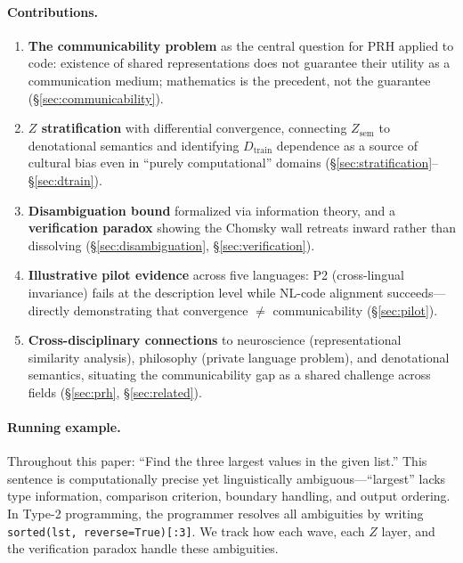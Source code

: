 \documentclass{article}
\theoremstyle{definition}
\newcommand{\Zsem}{Z_{\text{sem}}}
\newcommand{\Dtrain}{D_{\text{train}}}
\begin{document}
\paragraph{Contributions.}
\begin{enumerate}[label=(\arabic*),nosep]
  \item \textbf{The communicability problem} as the central question for PRH applied to code: existence of shared representations does not guarantee their utility as a communication medium; mathematics is the precedent, not the guarantee (\S\ref{sec:communicability}).
  \item \textbf{$Z$ stratification} with differential convergence, connecting $\Zsem$ to denotational semantics and identifying $\Dtrain$ dependence as a source of cultural bias even in ``purely computational'' domains (\S\ref{sec:stratification}--\S\ref{sec:dtrain}).
  \item \textbf{Disambiguation bound} formalized via information theory, and a \textbf{verification paradox} showing the Chomsky wall retreats inward rather than dissolving (\S\ref{sec:disambiguation}, \S\ref{sec:verification}).
  \item \textbf{Illustrative pilot evidence} across five languages: P2 (cross-lingual invariance) fails at the description level while NL-code alignment succeeds---directly demonstrating that convergence $\neq$ communicability (\S\ref{sec:pilot}).
  \item \textbf{Cross-disciplinary connections} to neuroscience (representational similarity analysis), philosophy (private language problem), and denotational semantics, situating the communicability gap as a shared challenge across fields (\S\ref{sec:prh}, \S\ref{sec:related}).
\end{enumerate}

\paragraph{Running example.}
Throughout this paper: ``Find the three largest values in the given list.'' This sentence is computationally precise yet linguistically ambiguous---``largest'' lacks type information, comparison criterion, boundary handling, and output ordering. In Type-2 programming, the programmer resolves all ambiguities by writing \texttt{sorted(lst, reverse=True)[:3]}. We track how each wave, each $Z$ layer, and the verification paradox handle these ambiguities.
\end{document}
